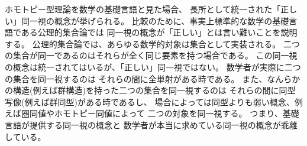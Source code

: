 \documentclass[index]{subfiles}
\begin{document}

ホモトピー型理論を数学の基礎言語と見た場合、
長所として統一された「正しい」同一視の概念が挙げられる。
比較のために、事実上標準的な数学の基礎言語である公理的集合論では
同一視の概念が「正しい」とは言い難いことを説明する。
公理的集合論では、あらゆる数学的対象は集合として実装される。
二つの集合が同一であるのはそれらが全く同じ要素を持つ場合である。
この同一視の概念は統一されてはいるが、「正しい」同一視ではない。
数学者が実際に二つの集合を同一視するのは
それらの間に全単射がある時である。
また、なんらかの構造(例えば群構造)を持った二つの集合を同一視するのは
それらの間に同型写像(例えば群同型)がある時であるし、
場合によっては同型よりも弱い概念、例えば圏同値やホモトピー同値によって
二つの対象を同一視する。
つまり、基礎言語が提供する同一視の概念と
数学者が本当に求めている同一視の概念が乖離している。
\end{document}
